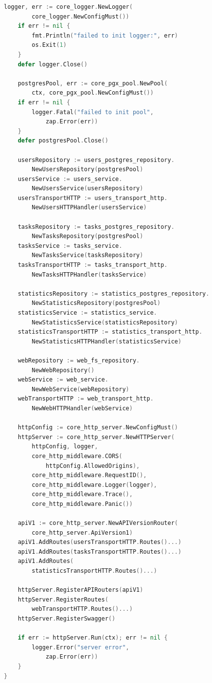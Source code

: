 \documentclass[a4paper,14pt]{extarticle}
\begin{document}
\begin{lstlisting}[language=Go]
    logger, err := core_logger.NewLogger(
        core_logger.NewConfigMust())
    if err != nil {
        fmt.Println("failed to init logger:", err)
        os.Exit(1)
    }
    defer logger.Close()

    postgresPool, err := core_pgx_pool.NewPool(
        ctx, core_pgx_pool.NewConfigMust())
    if err != nil {
        logger.Fatal("failed to init pool",
            zap.Error(err))
    }
    defer postgresPool.Close()

    usersRepository := users_postgres_repository.
        NewUsersRepository(postgresPool)
    usersService := users_service.
        NewUsersService(usersRepository)
    usersTransportHTTP := users_transport_http.
        NewUsersHTTPHandler(usersService)

    tasksRepository := tasks_postgres_repository.
        NewTasksRepository(postgresPool)
    tasksService := tasks_service.
        NewTasksService(tasksRepository)
    tasksTransportHTTP := tasks_transport_http.
        NewTasksHTTPHandler(tasksService)

    statisticsRepository := statistics_postgres_repository.
        NewStatisticsRepository(postgresPool)
    statisticsService := statistics_service.
        NewStatisticsService(statisticsRepository)
    statisticsTransportHTTP := statistics_transport_http.
        NewStatisticsHTTPHandler(statisticsService)

    webRepository := web_fs_repository.
        NewWebRepository()
    webService := web_service.
        NewWebService(webRepository)
    webTransportHTTP := web_transport_http.
        NewWebHTTPHandler(webService)

    httpConfig := core_http_server.NewConfigMust()
    httpServer := core_http_server.NewHTTPServer(
        httpConfig, logger,
        core_http_middleware.CORS(
            httpConfig.AllowedOrigins),
        core_http_middleware.RequestID(),
        core_http_middleware.Logger(logger),
        core_http_middleware.Trace(),
        core_http_middleware.Panic())

    apiV1 := core_http_server.NewAPIVersionRouter(
        core_http_server.ApiVersion1)
    apiV1.AddRoutes(usersTransportHTTP.Routes()...)
    apiV1.AddRoutes(tasksTransportHTTP.Routes()...)
    apiV1.AddRoutes(
        statisticsTransportHTTP.Routes()...)

    httpServer.RegisterAPIRouters(apiV1)
    httpServer.RegisterRoutes(
        webTransportHTTP.Routes()...)
    httpServer.RegisterSwagger()

    if err := httpServer.Run(ctx); err != nil {
        logger.Error("server error",
            zap.Error(err))
    }
}
\end{lstlisting}
\end{document}
